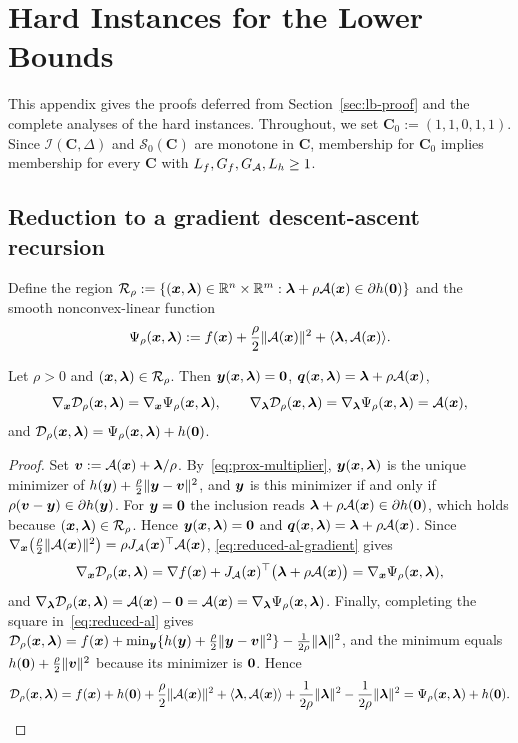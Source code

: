 \section{Hard Instances for the Lower Bounds}
\label{app:lower-bound}

This appendix gives the proofs deferred from Section~\ref{sec:lb-proof}
and the complete analyses of the hard instances. Throughout, we set
\(\mathbf C_0:=(1,1,0,1,1)\). Since \(\mathcal I(\mathbf C,\Delta)\) and
\(\mathcal S_0(\mathbf C)\) are monotone in \(\mathbf C\), membership for
\(\mathbf C_0\) implies membership for every \(\mathbf C\) with
\(L_f,G_f,G_{\mathcal{A}},L_h\ge1\).

\subsection{Reduction to a gradient descent-ascent recursion}
\label{subsec:gda-embedding}
\label{app:gda-embedding-proof}

Define the region
\(\mathcal R_\rho:=\{(\bm{x},\bm{\lambda})\in\mathbb{R}^n\times\mathbb{R}^m:\bm{\lambda}+\rho\mathcal{A}(\bm{x})\in\partial h(\bm{0})\}\)
and the smooth nonconvex-linear function
\[
    \Psi_\rho(\bm{x},\bm{\lambda}):=f(\bm{x})+\frac{\rho}{2}\|\mathcal{A}(\bm{x})\|^2
    +\langle\bm{\lambda},\mathcal{A}(\bm{x})\rangle.
\]

\begin{proposition}
\label{prop:reduction}
Let \(\rho>0\) and \((\bm{x},\bm{\lambda})\in\mathcal R_\rho\). Then
\(\bm{y}(\bm{x},\bm{\lambda})=\bm{0}\), \(\bm{q}(\bm{x},\bm{\lambda})=\bm{\lambda}+\rho\mathcal{A}(\bm{x})\),
\[
    \nabla_{\bm{x}}\mathcal{D}_\rho(\bm{x},\bm{\lambda})=\nabla_{\bm{x}}\Psi_\rho(\bm{x},\bm{\lambda}),
    \qquad
    \nabla_{\bm{\lambda}}\mathcal{D}_\rho(\bm{x},\bm{\lambda})=\nabla_{\bm{\lambda}}\Psi_\rho(\bm{x},\bm{\lambda})
    =\mathcal{A}(\bm{x}),
\]
and \(\mathcal{D}_\rho(\bm{x},\bm{\lambda})=\Psi_\rho(\bm{x},\bm{\lambda})+h(\bm{0})\).
\end{proposition}

\begin{proof}
Set \(\bm{v}:=\mathcal{A}(\bm{x})+\bm{\lambda}/\rho\). By~\eqref{eq:prox-multiplier}, \(\bm{y}(\bm{x},\bm{\lambda})\)
is the unique minimizer of \(h(\bm{y})+\frac{\rho}{2}\|\bm{y}-\bm{v}\|^2\), and
\(\bm{y}\) is this minimizer if and only if \(\rho(\bm{v}-\bm{y})\in\partial h(\bm{y})\).
For \(\bm{y}=\bm{0}\) the inclusion reads
\(\bm{\lambda}+\rho\mathcal{A}(\bm{x})\in\partial h(\bm{0})\), which holds because
\((\bm{x},\bm{\lambda})\in\mathcal R_\rho\). Hence \(\bm{y}(\bm{x},\bm{\lambda})=\bm{0}\) and
\(\bm{q}(\bm{x},\bm{\lambda})=\bm{\lambda}+\rho\mathcal{A}(\bm{x})\). Since
\(\nabla_{\bm{x}}\bigl(\frac{\rho}{2}\|\mathcal{A}(\bm{x})\|^2\bigr)=\rho J_{\mathcal{A}}(\bm{x})^\top\mathcal{A}(\bm{x})\),
\eqref{eq:reduced-al-gradient} gives
\[
\nabla_{\bm{x}}\mathcal{D}_\rho(\bm{x},\bm{\lambda})=
\nabla f(\bm{x})+J_{\mathcal{A}}(\bm{x})^\top\bigl(\bm{\lambda}+\rho\mathcal{A}(\bm{x})\bigr)
=\nabla_{\bm{x}}\Psi_\rho(\bm{x},\bm{\lambda}),
\]
and \(\nabla_{\bm{\lambda}}\mathcal{D}_\rho(\bm{x},\bm{\lambda})=\mathcal{A}(\bm{x})-\bm{0}=\mathcal{A}(\bm{x})=\nabla_{\bm{\lambda}}\Psi_\rho(\bm{x},\bm{\lambda})\).
Finally, completing the square in~\eqref{eq:reduced-al} gives
\(\mathcal{D}_\rho(\bm{x},\bm{\lambda})=f(\bm{x})+\min_{\bm{y}}\{h(\bm{y})+\frac{\rho}{2}\|\bm{y}-\bm{v}\|^2\}
-\frac{1}{2\rho}\|\bm{\lambda}\|^2\), and the minimum equals
\(h(\bm{0})+\frac{\rho}{2}\|\bm{v}\|^2\) because its minimizer is \(\bm{0}\). Hence
\[
\mathcal{D}_\rho(\bm{x},\bm{\lambda})
=f(\bm{x})+h(\bm{0})+\frac{\rho}{2}\|\mathcal{A}(\bm{x})\|^2+\langle\bm{\lambda},\mathcal{A}(\bm{x})\rangle
+\frac{1}{2\rho}\|\bm{\lambda}\|^2-\frac{1}{2\rho}\|\bm{\lambda}\|^2
=\Psi_\rho(\bm{x},\bm{\lambda})+h(\bm{0}).
\]
\end{proof}

